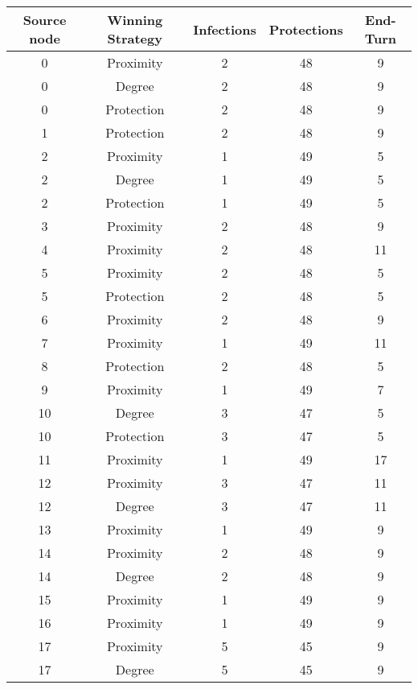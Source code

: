 \documentclass[results.tex]{subfiles}
\begin{document}
\begin{center}
  \begin{tabular}{| c || c | c | c | c |}
    \hline
    {\bfseries Source node} & {\bfseries Winning Strategy} & {\bfseries Infections} & {\bfseries Protections} & {\bfseries End-Turn} \\  %
    \hline\hline
    0 & Proximity & 2 & 48 & 9 \\ 
    \hline
    0 & Degree & 2 & 48 & 9 \\ 
    \hline
    0 & Protection & 2 & 48 & 9 \\ 
    \hline
    1 & Protection & 2 & 48 & 9 \\ 
    \hline
    2 & Proximity & 1 & 49 & 5 \\ 
    \hline
    2 & Degree & 1 & 49 & 5 \\ 
    \hline
    2 & Protection & 1 & 49 & 5 \\ 
    \hline
    3 & Proximity & 2 & 48 & 9 \\ 
    \hline
    4 & Proximity & 2 & 48 & 11 \\ 
    \hline
    5 & Proximity & 2 & 48 & 5 \\ 
    \hline
    5 & Protection & 2 & 48 & 5 \\ 
    \hline
    6 & Proximity & 2 & 48 & 9 \\ 
    \hline
    7 & Proximity & 1 & 49 & 11 \\ 
    \hline
    8 & Protection & 2 & 48 & 5 \\ 
    \hline
    9 & Proximity & 1 & 49 & 7 \\ 
    \hline
    10 & Degree & 3 & 47 & 5 \\ 
    \hline
    10 & Protection & 3 & 47 & 5 \\ 
    \hline
    11 & Proximity & 1 & 49 & 17 \\ 
    \hline
    12 & Proximity & 3 & 47 & 11 \\ 
    \hline
    12 & Degree & 3 & 47 & 11 \\ 
    \hline
    13 & Proximity & 1 & 49 & 9 \\ 
    \hline
    14 & Proximity & 2 & 48 & 9 \\ 
    \hline
    14 & Degree & 2 & 48 & 9 \\ 
    \hline
    15 & Proximity & 1 & 49 & 9 \\ 
    \hline
    16 & Proximity & 1 & 49 & 9 \\ 
    \hline
    17 & Proximity & 5 & 45 & 9 \\ 
    \hline
    17 & Degree & 5 & 45 & 9 \\ 

\end{tabular}
\end{center}
\end{document}
